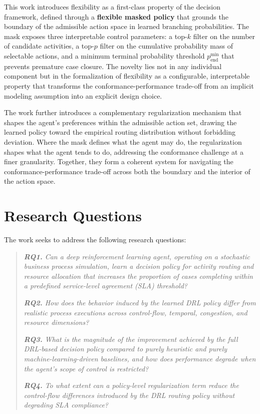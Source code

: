 \documentclass[journal,onecolumn]{IEEEtran}
\begin{document}
This work introduces flexibility as a first-class property of
the decision framework, defined through a \textbf{flexible
masked policy} that grounds the boundary of the admissible action
space in learned branching probabilities. The mask exposes three
interpretable control parameters: a top-$k$ filter on the number
of candidate activities, a top-$p$ filter on the cumulative
probability mass of selectable actions, and a minimum terminal
probability threshold $p_{\mathrm{end}}^{\min}$ that prevents
premature case closure. The novelty lies not in any individual
component but in the formalization of flexibility as a configurable,
interpretable property that transforms the conformance-performance
trade-off from an implicit modeling assumption into an explicit
design choice.

The work further introduces a complementary regularization
mechanism that shapes the agent's preferences within the admissible
action set, drawing the learned policy toward the empirical routing
distribution without forbidding deviation. Where the mask defines
what the agent may do, the regularization shapes what the agent
tends to do, addressing the conformance challenge at a finer
granularity. Together, they form a coherent system for navigating
the conformance-performance trade-off across both the boundary
and the interior of the action space.


\section{Research Questions}
\label{sec:research_questions}


The work seeks to address the following research questions:

\begin{quote}
\textit{\textbf{RQ1.} Can a deep reinforcement learning agent,
operating on a stochastic business process simulation, learn a
decision policy for activity routing and resource allocation that
increases the proportion of cases completing within a predefined
service-level agreement (SLA) threshold?}

\textit{\textbf{RQ2.} How does the behavior induced by the learned
DRL policy differ from realistic process executions across
control-flow, temporal, congestion, and resource dimensions?}

\textit{\textbf{RQ3.} What is the magnitude of the improvement
achieved by the full DRL-based decision policy compared to purely
heuristic and purely machine-learning-driven baselines, and how
does performance degrade when the agent's scope of control is
restricted?}

\textit{\textbf{RQ4.} To what extent can a policy-level
regularization term reduce the control-flow differences introduced
by the DRL routing policy without degrading SLA compliance?}
\end{quote}
\end{document}
